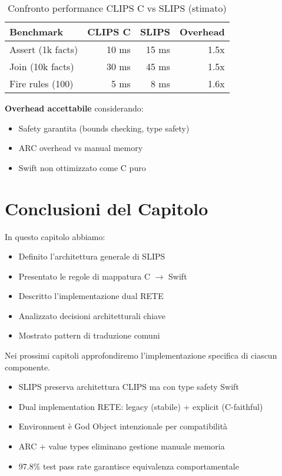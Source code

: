 \begin{table}[h]
\centering
\begin{tabular}{@{}lrrr@{}}
\toprule
\textbf{Benchmark} & \textbf{CLIPS C} & \textbf{SLIPS} & \textbf{Overhead} \\
\midrule
Assert (1k facts) & 10 ms & 15 ms & 1.5x \\
Join (10k facts) & 30 ms & 45 ms & 1.5x \\
Fire rules (100) & 5 ms & 8 ms & 1.6x \\
\bottomrule
\end{tabular}
\caption{Confronto performance CLIPS C vs SLIPS (stimato)}
\label{tab:perf_comparison}
\end{table}

\textbf{Overhead accettabile} considerando:
\begin{itemize}
\item Safety garantita (bounds checking, type safety)
\item ARC overhead vs manual memory
\item Swift non ottimizzato come C puro
\end{itemize}

\section{Conclusioni del Capitolo}

In questo capitolo abbiamo:

\begin{itemize}
\item Definito l'architettura generale di SLIPS
\item Presentato le regole di mappatura C $\to$ Swift
\item Descritto l'implementazione dual RETE
\item Analizzato decisioni architetturali chiave
\item Mostrato pattern di traduzione comuni
\end{itemize}

Nei prossimi capitoli approfondiremo l'implementazione specifica di ciascun componente.

\begin{successbox}
\begin{itemize}
\item SLIPS preserva architettura CLIPS ma con type safety Swift
\item Dual implementation RETE: legacy (stabile) + explicit (C-faithful)
\item Environment è God Object intenzionale per compatibilità
\item ARC + value types eliminano gestione manuale memoria
\item 97.8\% test pass rate garantisce equivalenza comportamentale
\end{itemize}
\end{successbox}

